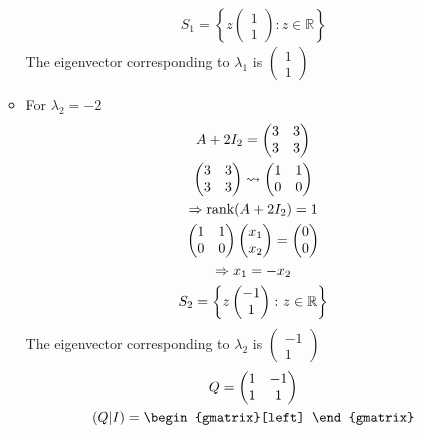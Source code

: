 \begin{enumerate}
\begin{itemize}
\begin{gather}
S_1 = \left\{z\begin{pmatrix}1\\1\end{pmatrix}\colon z \in
  \mathbb{R}\right\}
\end{gather}
The eigenvector corresponding to $\lambda_1$ is $\begin{pmatrix}1\\1\end{pmatrix}$
\item For $\lambda_2 = -2$
\begin{gather}
A +2I_2 = \begin{pmatrix}
3 & 3 \\
3 & 3
\end{pmatrix}\\
\begin{pmatrix}
3 & 3 \\
3 & 3
\end{pmatrix}\leadsto
\begin{pmatrix}
1 & 1\\
0 & 0
\end{pmatrix}\\
\Rightarrow \text{rank}({A+2I_2}) = 1\\
\begin{pmatrix}
1 & 1\\
0 & 0
\end{pmatrix}
\begin{pmatrix}
x_1 \\ x_2
\end{pmatrix}
=
\begin{pmatrix}
0\\0
\end{pmatrix}\\
\Rightarrow x_1=-x_2\\
S_2 = \left\{z\begin{pmatrix}-1\\1\end{pmatrix}\colon z\in \mathbb{R}\right\}
\end{gather}
The eigenvector corresponding to $\lambda_2$ is
$\begin{pmatrix}-1\\1\end{pmatrix}$
\begin{gather}
Q = \begin{pmatrix}
1 & -1 \\
1 & 1
\end{pmatrix}\\
(Q|I) = \begin{gmatrix}[left]

\end{gmatrix}
\end{gather}
\end{itemize}
\end{enumerate}

